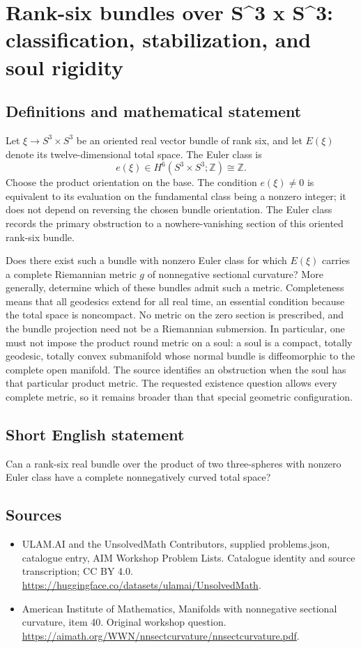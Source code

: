 \documentclass[11pt,a4paper]{article}
\begin{document}
\section*{Rank-six bundles over S\textasciicircum{}3 x S\textasciicircum{}3: classification, stabilization, and soul rigidity}\label{statement}

\subsection{Definitions and mathematical statement}
Let $\xi\to S^3\times S^3$ be an oriented real vector bundle of rank six, and let $E(\xi)$ denote its twelve-dimensional total space.
The Euler class is
\[
 e(\xi)\in H^6(S^3\times S^3;\mathbb Z)\cong\mathbb Z.
\]
Choose the product orientation on the base.
The condition $e(\xi)\ne0$ is equivalent to its evaluation on the fundamental class being a nonzero integer; it does not depend on reversing the chosen bundle orientation.
The Euler class records the primary obstruction to a nowhere-vanishing section of this oriented rank-six bundle.

Does there exist such a bundle with nonzero Euler class for which $E(\xi)$ carries a complete Riemannian metric $g$ of nonnegative sectional curvature?
More generally, determine which of these bundles admit such a metric.
Completeness means that all geodesics extend for all real time, an essential condition because the total space is noncompact.
No metric on the zero section is prescribed, and the bundle projection need not be a Riemannian submersion.
In particular, one must not impose the product round metric on a soul: a soul is a compact, totally geodesic, totally convex submanifold whose normal bundle is diffeomorphic to the complete open manifold.
The source identifies an obstruction when the soul has that particular product metric.
The requested existence question allows every complete metric, so it remains broader than that special geometric configuration.
\subsection{Short English statement}
Can a rank-six real bundle over the product of two three-spheres with nonzero Euler class have a complete nonnegatively curved total space?
\subsection{Sources}
\begin{itemize}
\item[S1] ULAM.AI and the UnsolvedMath Contributors, supplied problems.json, catalogue entry, AIM Workshop Problem Lists. Catalogue identity and source transcription; CC BY 4.0.
\url{https://huggingface.co/datasets/ulamai/UnsolvedMath}.
\item[S2] American Institute of Mathematics, Manifolds with nonnegative sectional curvature, item 40. Original workshop question.
\url{https://aimath.org/WWN/nnsectcurvature/nnsectcurvature.pdf}.
\end{itemize}
\end{document}
